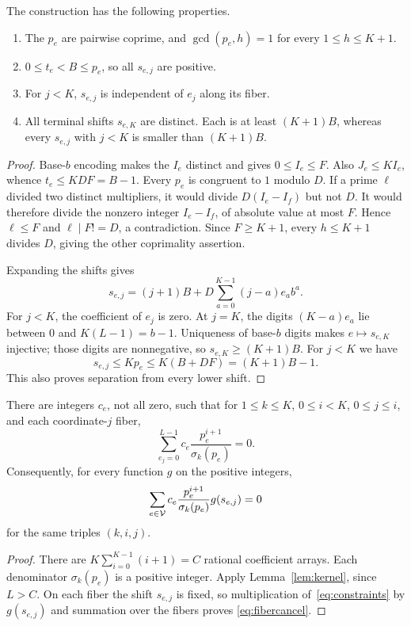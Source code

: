 \begin{lemma}\label{lem:grid}
The construction has the following properties.
\begin{enumerate}
\item The $p_e$ are pairwise coprime, and $\gcd(p_e,h)=1$ for
every $1\leq h\leq K+1$.
\item $0\leq t_e<B\leq p_e$, so all $s_{e,j}$ are positive.
\item For $j<K$, $s_{e,j}$ is independent of $e_j$ along its fiber.
\item All terminal shifts $s_{e,K}$ are distinct. Each is at least
$(K+1)B$, whereas every $s_{e,j}$ with $j<K$ is smaller than $(K+1)B$.
\end{enumerate}
\end{lemma}
\begin{proof}
Base-$b$ encoding makes the $I_e$ distinct and gives $0\leq I_e\leq F$.
Also $J_e\leq KI_e$, whence $t_e\leq KDF=B-1$.
Every $p_e$ is congruent to $1$ modulo $D$. If a prime $\ell$ divided
two distinct multipliers, it would divide $D(I_e-I_f)$ but not $D$.
It would therefore divide the nonzero integer $I_e-I_f$, of absolute
value at most $F$. Hence $\ell\leq F$ and $\ell\mid F!=D$, a
contradiction. Since $F\geq K+1$, every $h\leq K+1$ divides $D$,
giving the other coprimality assertion.

Expanding the shifts gives
\begin{equation}\label{eq:shift}
 s_{e,j}=(j+1)B+D\sum_{a=0}^{K-1}(j-a)e_ab^a.
\end{equation}
For $j<K$, the coefficient of $e_j$ is zero. At $j=K$, the digits
$(K-a)e_a$ lie between $0$ and $K(L-1)=b-1$. Uniqueness of base-$b$
digits makes $e\mapsto s_{e,K}$ injective; those digits are
nonnegative, so $s_{e,K}\geq(K+1)B$.
For $j<K$ we have
\[
 s_{e,j}\leq Kp_e\leq K(B+DF)=(K+1)B-1.
\]
This also proves separation from every lower shift.
\end{proof}

\begin{lemma}\label{lem:weights}
There are integers $c_e$, not all zero, such that for
$1\leq k\leq K$, $0\leq i<K$, $0\leq j\leq i$, and each
coordinate-$j$ fiber,
\begin{equation}\label{eq:constraints}
 \sum_{e_j=0}^{L-1}c_e\frac{p_e^{i+1}}{\sigma_k(p_e)}=0.
\end{equation}
Consequently, for every function $g$ on the positive integers,
\begin{equation}\label{eq:fibercancel}
 \sum_{e\in\mathcal V}c_e\frac{p_e^{i+1}}{\sigma_k(p_e)}g(s_{e,j})=0
\end{equation}
for the same triples $(k,i,j)$.
\end{lemma}
\begin{proof}
There are $K\sum_{i=0}^{K-1}(i+1)=C$ rational coefficient arrays.
Each denominator $\sigma_k(p_e)$ is a positive integer. Apply
Lemma~\ref{lem:kernel}, since $L>C$. On each fiber the shift
$s_{e,j}$ is fixed, so multiplication of~\eqref{eq:constraints}
by $g(s_{e,j})$ and summation over the fibers proves
\eqref{eq:fibercancel}.
\end{proof}

